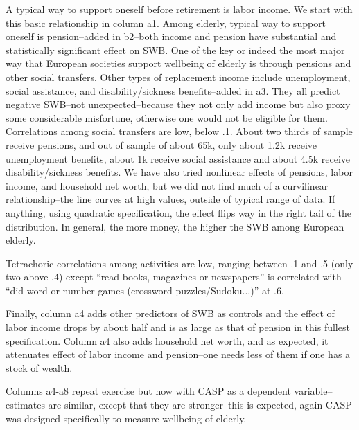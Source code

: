 \documentclass[10pt, letterpaper]{article}
\begin{document}
\begin{spacing}{1.4}
A typical way to support oneself
before retirement is labor
income. We start with this basic relationship in column a1. Among elderly,
 typical way to support oneself is pension--added in b2--both income and pension 
have substantial and statistically significant effect on SWB. 
%
One of the key or indeed the most major way that European societies support
wellbeing of elderly is through pensions and other social transfers.
%
Other types of replacement income include unemployment, social assistance, and disability/sickness
benefits--added in a3. They all predict negative SWB--not unexpected--because
they not only add income but also proxy some considerable misfortune,
otherwise one would not be eligible for them. 
%
Correlations among social transfers are low, below .1. About two thirds of
sample receive pensions, and out of sample of about 65k, only about 1.2k receive
unemployment benefits,  about 1k receive social assistance and about 4.5k
receive disability/sickness benefits.
%
We have also tried nonlinear effects of pensions, labor income, and household
net worth, but we did not find much of a curvilinear
relationship--the line curves at high values, outside of typical range of data. If anything, using quadratic specification, the effect flips way in the right tail of the distribution.
In general, the more money, the higher the SWB among European elderly. 

Tetrachoric correlations among activities are low, ranging between .1 and .5
(only two above .4) except ``read books, magazines or newspapers'' is
correlated with ``did word or number games (crossword puzzles/Sudoku...)'' at .6.

Finally, column a4 adds other predictors of SWB as controls and the effect of labor income drops by
about half
and is as large as that of pension in this fullest specification. Column a4 also adds household net
worth, and as expected, it attenuates effect of labor income and pension--one
needs less of them if one has a stock of wealth. 
%

Columns a4-a8 repeat exercise but now with CASP as a dependent
variable--estimates are similar, except that they are
stronger--this is expected, again CASP was designed specifically
to measure wellbeing of elderly. 

%



\end{spacing}
\end{document}
